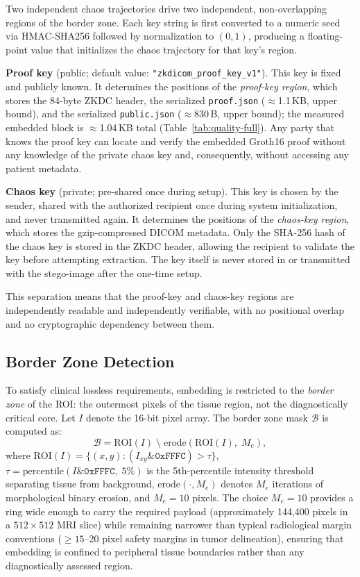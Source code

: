 \documentclass{jstarticle}
\begin{document}
Two independent chaos trajectories drive two independent, non-overlapping regions of the border zone.
Each key string is first converted to a numeric seed via HMAC-SHA256 followed by normalization to $(0, 1)$, producing a floating-point value that initializes the chaos trajectory for that key's region.

\textbf{Proof key} (public; default value: \texttt{"zkdicom\_proof\_key\_v1"}).
This key is fixed and publicly known.
It determines the positions of the \emph{proof-key region}, which stores the 84-byte ZKDC header, the serialized \texttt{proof.json} ($\approx$1.1\,KB, upper bound), and the serialized \texttt{public.json} ($\approx$830\,B, upper bound); the measured embedded block is $\approx$1.04\,KB total (Table~\ref{tab:quality-full}).
Any party that knows the proof key can locate and verify the embedded Groth16 proof without any knowledge of the private chaos key and, consequently, without accessing any patient metadata.

\textbf{Chaos key} (private; pre-shared once during setup).
This key is chosen by the sender, shared with the authorized recipient once during system initialization, and never transmitted again.
It determines the positions of the \emph{chaos-key region}, which stores the gzip-compressed DICOM metadata.
Only the SHA-256 hash of the chaos key is stored in the ZKDC header, allowing the recipient to validate the key before attempting extraction.
The key itself is never stored in or transmitted with the stego-image after the one-time setup.

This separation means that the proof-key and chaos-key regions are independently readable and independently verifiable, with no positional overlap and no cryptographic dependency between them.

\subsection{Border Zone Detection}
\label{subsec:borderzone}

To satisfy clinical lossless requirements, embedding is restricted to the \emph{border zone} of the ROI: the outermost pixels of the tissue region, not the diagnostically critical core.
Let $I$ denote the 16-bit pixel array.
The border zone mask $\mathcal{B}$ is computed as:
\begin{equation}
\mathcal{B} = \mathrm{ROI}(I) \;\setminus\; \mathrm{erode}\!\left(\mathrm{ROI}(I),\; M_e\right),
\label{eq:borderzone}
\end{equation}
where $\mathrm{ROI}(I) = \{(x,y) : (I_{xy} \mathbin{\&} \mathtt{0xFFFC}) > \tau\}$, $\tau = \mathrm{percentile}(I \mathbin{\&} \mathtt{0xFFFC},\; 5\%)$ is the 5th-percentile intensity threshold separating tissue from background, $\mathrm{erode}(\cdot, M_e)$ denotes $M_e$ iterations of morphological binary erosion, and $M_e = 10$ pixels.
The choice $M_e = 10$ provides a ring wide enough to carry the required payload (approximately 144,400 pixels in a $512\times512$ MRI slice) while remaining narrower than typical radiological margin conventions ($\geq 15$--20 pixel safety margins in tumor delineation), ensuring that embedding is confined to peripheral tissue boundaries rather than any diagnostically assessed region.
\end{document}
